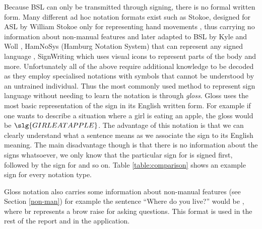\documentclass[12pt]{ociamthesis}  %
\begin{document}
Because BSL can only be transmitted through signing, there is no formal written form. Many different ad hoc notation formats exist such as Stokoe, designed for ASL by William Stokoe only for representing hand movements , thus carrying no information about non-manual features and later adapted to BSL by Kyle and Woll , HamNoSys (Hamburg Notation System) that can represent any signed language , SignWriting which uses visual icons to represent parts of the body  and more. Unfortunately all of the above require additional knowledge to be decoded as they employ specialised notations with symbols that cannot be understood by an untrained individual. Thus the most commonly used method to represent sign language without needing to learn the notation is through \textit{gloss}. Gloss uses the most basic representation of the sign in its English written form. For example if one wants to describe a situation where a girl is eating an apple, the gloss would be $\slg{GIRL EAT APPLE}$. The advantage of this notation is that we can clearly understand what a sentence means as we associate the sign to its English meaning. The main disadvantage though is that there is no information about the signs whatsoever, we only know that the particular sign for  is signed first, followed by the sign for  and so on. Table \ref{table:comparison} shows an example sign for every notation type.

Gloss notation also carries some information about non-manual features (see Section \ref{non-man}) for example the sentence ``Where do you live?'' would be , where br represents a brow raise for asking questions. This format is used in the rest of the report and in the application.
\end{document}
